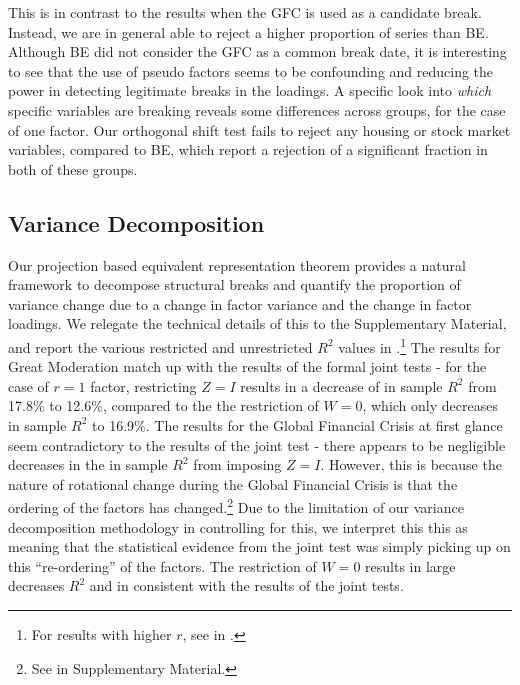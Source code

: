 \documentclass[12pt]{article}
\theoremstyle{plain}
\numberwithin{equation}{section}
\begin{document}
This is in contrast to the results when the GFC is used as a candidate break. Instead, we are in general able to reject a higher proportion of series than BE. Although BE did not consider the GFC as a common break date, it is interesting to see that the use of pseudo factors seems to be confounding and reducing the power in detecting legitimate breaks in the loadings. A specific look into \emph{which} specific variables are breaking reveals some differences across groups, for the case of one factor. Our orthogonal shift test fails to reject any housing or stock market variables, compared to BE, which report a rejection of a significant fraction in both of these groups. 
\subsection{Variance Decomposition}
Our projection based equivalent representation theorem provides a natural framework to decompose structural breaks and quantify the proportion of variance change due to a change in factor variance and the change in factor loadings. We relegate the technical details of this to the Supplementary Material, and report the various restricted and unrestricted $R^2$ values in .\footnote{For results with higher $r$, see  in .} The results for Great Moderation match up with the results of the formal joint tests - for the case of $r = 1$ factor, restricting $Z = I$ results in a decrease of in sample $R^2$ from 17.8\% to 12.6\%, compared to the the restriction of $W = 0$, which only decreases in sample $R^2$ to 16.9\%. 
The results for the Global Financial Crisis at first glance seem contradictory to the results of the joint test - there appears to be negligible decreases in the in sample $R^2$ from imposing $Z = I$. However, this is because the nature of rotational change during the Global Financial Crisis is that the ordering of the factors has changed.\footnote{See  in Supplementary Material.} Due to the limitation of our variance decomposition methodology in controlling for this, we interpret this this as meaning that the statistical evidence from the joint test was simply picking up on this ``re-ordering'' of the factors. The restriction of $W = 0$ results in large decreases $R^2$ and in consistent with the results of the joint tests. 
\end{document}
